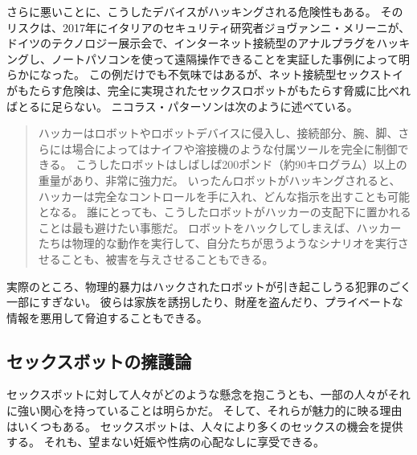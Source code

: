 \documentclass[paper=a4,book,openany]{jlreq}
\begin{document}
さらに悪いことに、こうしたデバイスがハッキングされる危険性もある。
そのリスクは、2017年にイタリアのセキュリティ研究者ジョヴァンニ・メリーニが、ドイツのテクノロジー展示会で、インターネット接続型のアナルプラグをハッキングし、ノートパソコンを使って遠隔操作できることを実証した事例によって明らかになった\citep{oberhaus17:_secur_resear_hacked_bluet_enabl_butt_plug}。
この例だけでも不気味ではあるが、ネット接続型セックストイがもたらす危険は、完全に実現されたセックスロボットがもたらす脅威に比べればとるに足らない。
ニコラス・パターソンは次のように述べている。

\begin{quote}
ハッカーはロボットやロボットデバイスに侵入し、接続部分、腕、脚、さらには場合によってはナイフや溶接機のような付属ツールを完全に制御できる。
こうしたロボットはしばしば200ポンド（約90キログラム）以上の重量があり、非常に強力だ。
いったんロボットがハッキングされると、ハッカーは完全なコントロールを手に入れ、どんな指示を出すことも可能となる。
誰にとっても、こうしたロボットがハッカーの支配下に置かれることは最も避けたい事態だ。
ロボットをハックしてしまえば、ハッカーたちは物理的な動作を実行して、自分たちが思うようなシナリオを実行させることも、被害を与えさせることもできる。
\citep{oberhaus17:_secur_resear_hacked_bluet_enabl_butt_plug}
\end{quote}

実際のところ、物理的暴力はハックされたロボットが引き起こしうる犯罪のごく一部にすぎない。
彼らは家族を誘拐したり、財産を盗んだり、プライベートな情報を悪用して脅迫することもできる。

\subsection{セックスボットの擁護論}

セックスボットに対して人々がどのような懸念を抱こうとも、一部の人々がそれに強い関心を持っていることは明らかだ。
そして、それらが魅力的に映る理由はいくつもある。
セックスボットは、人々により多くのセックスの機会を提供する。
それも、望まない妊娠や性病の心配なしに享受できる。
\end{document}

